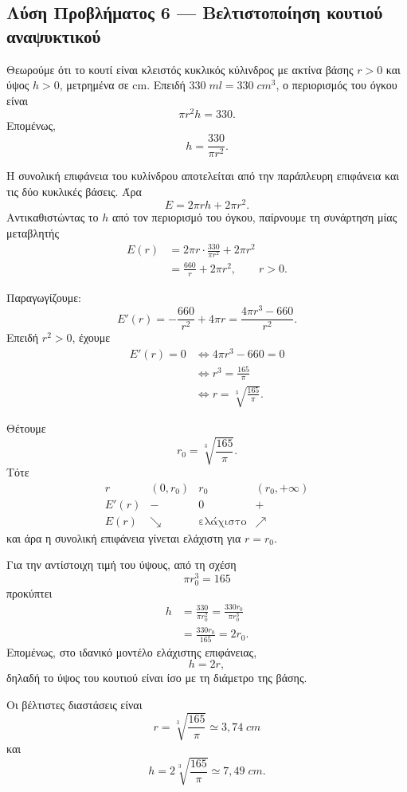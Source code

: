 \subsection*{Λύση Προβλήματος 6 --- Βελτιστοποίηση κουτιού αναψυκτικού}

Θεωρούμε ότι το κουτί είναι κλειστός κυκλικός κύλινδρος με ακτίνα
βάσης $r>0$ και ύψος $h>0$, μετρημένα σε \si{cm}. Επειδή
$330\;\si{ml}=330\;\si{cm^3}$, ο περιορισμός του όγκου είναι
\[
  \pi r^2h=330.
\]
Επομένως,
\[
  h=\frac{330}{\pi r^2}.
\]

Η συνολική επιφάνεια του κυλίνδρου αποτελείται από την παράπλευρη
επιφάνεια και τις δύο κυκλικές βάσεις. Άρα
\[
  E=2\pi rh+2\pi r^2.
\]
Αντικαθιστώντας το $h$ από τον περιορισμό του όγκου, παίρνουμε τη
συνάρτηση μίας μεταβλητής
\begin{align*}
  E(r)
  &=2\pi r\cdot\frac{330}{\pi r^2}+2\pi r^2\\
  &=\frac{660}{r}+2\pi r^2,
  \qquad r>0.
\end{align*}

Παραγωγίζουμε:
\[
  E'(r)
  =-\frac{660}{r^2}+4\pi r
  =\frac{4\pi r^3-660}{r^2}.
\]
Επειδή $r^2>0$, έχουμε
\begin{align*}
  E'(r)=0
  &\Longleftrightarrow 4\pi r^3-660=0\\
  &\Longleftrightarrow r^3=\frac{165}{\pi}\\
  &\Longleftrightarrow
  r=\sqrt[3]{\frac{165}{\pi}}.
\end{align*}

Θέτουμε
\[
  r_0=\sqrt[3]{\frac{165}{\pi}}.
\]
Τότε
\[
\begin{array}{c|ccc}
  r & (0,r_0) & r_0 & (r_0,+\infty)\\ \hline
  E'(r) & - & 0 & +\\
  E(r) & \searrow & \text{ελάχιστο} & \nearrow
\end{array}
\]
και άρα η συνολική επιφάνεια γίνεται ελάχιστη για $r=r_0$.

Για την αντίστοιχη τιμή του ύψους, από τη σχέση
\[
  \pi r_0^3=165
\]
προκύπτει
\begin{align*}
  h
  &=\frac{330}{\pi r_0^2}
    =\frac{330r_0}{\pi r_0^3}\\
  &=\frac{330r_0}{165}
    =2r_0.
\end{align*}
Επομένως, στο ιδανικό μοντέλο ελάχιστης επιφάνειας,
\[
  {h=2r},
\]
δηλαδή το ύψος του κουτιού είναι ίσο με τη διάμετρο της βάσης.

Οι βέλτιστες διαστάσεις είναι
\[
  {
    r=\sqrt[3]{\frac{165}{\pi}}\simeq3{,}74\;\si{cm}
  }
\]
και
\[
  {
    h=2\sqrt[3]{\frac{165}{\pi}}\simeq7{,}49\;\si{cm}
  }.
\]

